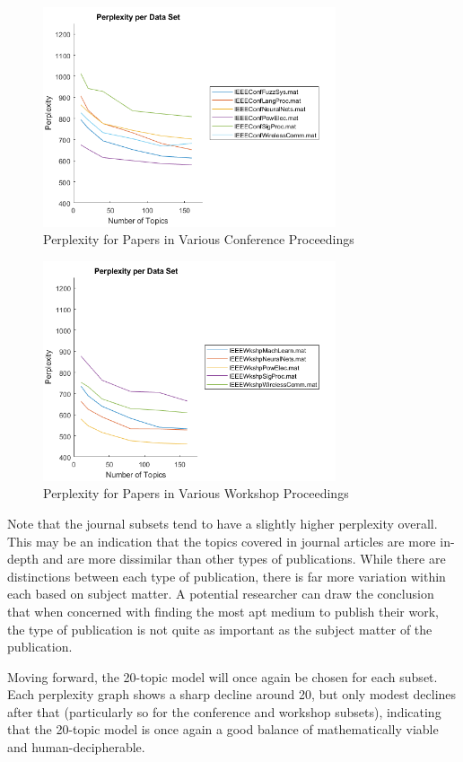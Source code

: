 \documentclass[conference]{IEEEtran}
\begin{document}
\begin{figure}
	\centering
	\includegraphics[width=3.4in]{conf_ppl.png}
	\caption{Perplexity for Papers in Various Conference Proceedings}
	\label{fig:conf_ppl}
\end{figure}

\begin{figure}
	\centering
	\includegraphics[width=3.4in]{wkshp_ppl.png}
	\caption{Perplexity for Papers in Various Workshop Proceedings}
	\label{fig:wkshp_ppl}
\end{figure}

Note that the journal subsets tend to have a slightly higher perplexity overall. This may be an indication that the topics covered in journal articles are more in-depth and are more dissimilar than other types of publications. While there are distinctions between each type of publication, there is far more variation within each based on subject matter. A potential researcher can draw the conclusion that when concerned with finding the most apt medium to publish their work, the type of publication is not quite as important as the subject matter of the publication. 

Moving forward, the 20-topic model will once again be chosen for each subset. Each perplexity graph shows a sharp decline around 20, but only modest declines after that (particularly so for the conference and workshop subsets), indicating that the 20-topic model is once again a good balance of mathematically viable and human-decipherable.
\end{document}
